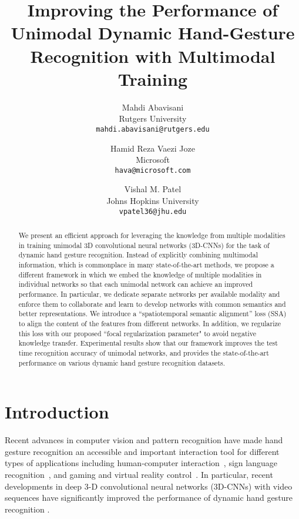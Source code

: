 \documentclass[10pt,twocolumn,letterpaper]{article}
\begin{document}
\title{Improving the Performance of Unimodal Dynamic Hand-Gesture Recognition with Multimodal Training}

\author{Mahdi Abavisani\\Rutgers University\\
{\tt\small mahdi.abavisani@rutgers.edu}
\and
Hamid Reza Vaezi Joze\\
Microsoft\\
{\tt\small hava@microsoft.com}
\and
Vishal M. Patel\\
Johns Hopkins University\\
{\tt\small vpatel36@jhu.edu}
}

\maketitle


\begin{abstract}
We present an efficient approach for leveraging the knowledge from multiple modalities in training unimodal 3D convolutional neural networks (3D-CNNs) for the task of dynamic hand gesture recognition.   Instead of explicitly combining multimodal information, which is commonplace in many state-of-the-art methods, we propose a different framework in which we embed the knowledge of multiple modalities in individual networks so that each unimodal network can achieve an improved performance.  In particular, we dedicate separate networks per available modality and enforce them to collaborate and learn to develop networks with common semantics and better representations.  We introduce a ``spatiotemporal semantic alignment'' loss (SSA) to align the content of the features from different networks.  In addition, we regularize this loss with our proposed ``focal regularization parameter" to avoid negative knowledge transfer.   Experimental results show that our framework improves the test time recognition accuracy of unimodal networks, and provides the state-of-the-art performance on various dynamic hand gesture recognition datasets.  

\end{abstract}

\section{Introduction}
Recent advances in computer vision and pattern recognition have made hand gesture recognition an accessible and important interaction tool for different types of applications including human-computer interaction~\cite{rautaray2015vision}, sign language recognition~\cite{camgoz2017subunets}, and gaming and virtual reality control~\cite{lv2015touch}.   In particular, recent developments in deep 3-D convolutional neural networks (3D-CNNs) with video sequences have significantly improved the performance of dynamic hand gesture recognition \cite{neverova2014multi,molchanov2015hand,molchanov2016online}.
\end{document}
